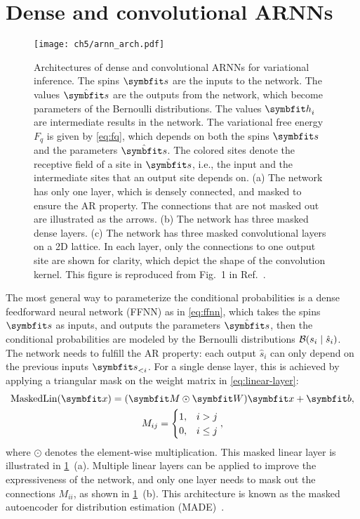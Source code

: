 \section{Dense and convolutional ARNNs}
\label{sec:made}

\begin{figure}[htb]
\centering
\texttt{[image: ch5/arnn\_arch.pdf]}
\caption[Architectures of autoregressive neural networks (ARNNs)]{
Architectures of dense and convolutional ARNNs for variational inference.
The spins $\vs$ are the inputs to the network.
The values $\hat{\vs}$ are the outputs from the network, which become parameters of the Bernoulli distributions.
The values $\vh_i$ are intermediate results in the network.
The variational free energy $F_q$ is given by \cref{eq:fq}, which depends on both the spins $\vs$ and the parameters $\hat{\vs}$.
The colored sites denote the receptive field of a site in $\hat{\vs}$, i.e., the input and the intermediate sites that an output site depends on.
(a) The network has only one layer, which is densely connected, and masked to ensure the AR property. The connections that are not masked out are illustrated as the arrows.
(b) The network has three masked dense layers.
(c) The network has three masked convolutional layers on a 2D lattice. In each layer, only the connections to one output site are shown for clarity, which depict the shape of the convolution kernel.
This figure is reproduced from Fig.~1 in Ref.~\cite{wu2019solving}.
}
\label{fig:arnn-arch}
\end{figure}

The most general way to parameterize the conditional probabilities is a dense feedforward neural network (FFNN) as in \cref{eq:ffnn}, which takes the spins $\vs$ as inputs, and outputs the parameters $\hat{\vs}$, then the conditional probabilities are modeled by the Bernoulli distributions $\mathcal{B}(s_i \mid \hat{s}_i)$. The network needs to fulfill the AR property: each output $\hat{s}_i$ can only depend on the previous inputs $\vs_{< i}$. For a single dense layer, this is achieved by applying a triangular mask on the weight matrix in \cref{eq:linear-layer}:
\begin{gather}
\text{MaskedLin}(\vx) = (\mM \odot \mW) \vx + \vb, \\
M_{i j} = \begin{cases}
1, & i > j \\
0, & i \le j
\end{cases},
\end{gather}
where $\odot$ denotes the element-wise multiplication. This masked linear layer is illustrated in \cref{fig:arnn-arch}~(a). Multiple linear layers can be applied to improve the expressiveness of the network, and only one layer needs to mask out the connections $M_{i i}$, as shown in \cref{fig:arnn-arch}~(b). This architecture is known as the masked autoencoder for distribution estimation (MADE)~\cite{germain2015made}.

